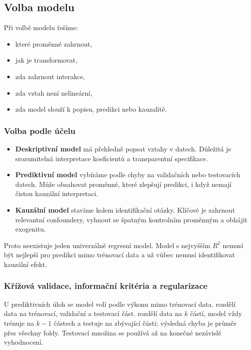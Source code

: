 \subsection{Volba modelu}

Při volbě modelu řešíme:
\begin{itemize}
    \item které proměnné zahrnout,
    \item jak je transformovat,
    \item zda zahrnout interakce,
    \item zda vztah není nelineární,
    \item zda model slouží k popisu, predikci nebo kauzalitě.
\end{itemize}

\subsubsection{Volba podle účelu}

\begin{itemize}
    \item \textbf{Deskriptivní model} má přehledně popsat vztahy v datech. Důležitá je srozumitelná
    interpretace koeficientů a transparentní specifikace.
    \item \textbf{Prediktivní model} vybíráme podle chyby na validačních nebo testovacích datech.
    Může obsahovat proměnné, které zlepšují predikci, i když nemají čistou kauzální interpretaci.
    \item \textbf{Kauzální model} stavíme kolem identifikační otázky. Klíčové je zahrnout relevantní
    confoundery, vyhnout se špatným kontrolním proměnným a obhájit exogenitu.
\end{itemize}

Proto neexistuje jeden univerzálně  regresní model. Model s nejvyšším $R^2$ nemusí být
nejlepší pro predikci mimo trénovací data a už vůbec nemusí identifikovat kauzální efekt.

\subsubsection{Křížová validace, informační kritéria a regularizace}
U prediktivních úloh se model volí podle výkonu mimo trénovací data.  rozdělí data na
trénovací, validační a testovací část.  rozdělí data na \(k\) částí,
model vždy trénuje na \(k-1\) částech a testuje na zbývající části; výsledná chyba je průměr přes
všechny foldy. Testovací množina se používá až na konečné nezávislé vyhodnocení.

